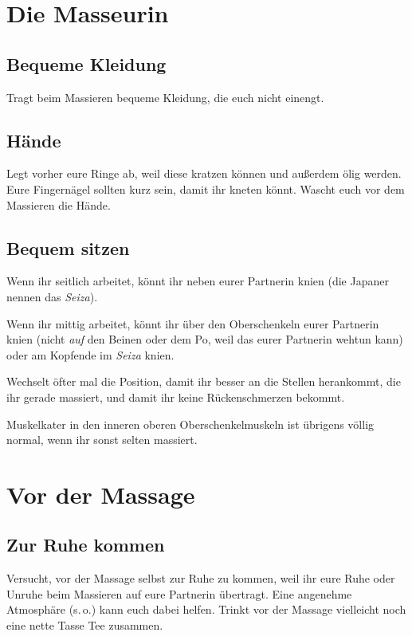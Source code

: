 \section{Die Masseurin}

\subsection{Bequeme Kleidung}

Tragt beim Massieren bequeme Kleidung, die euch nicht einengt.

\subsection{Hände}

Legt vorher eure Ringe ab, weil diese kratzen können und außerdem ölig werden. Eure Fingernägel sollten kurz sein, damit ihr kneten könnt. Wascht euch vor dem Massieren die Hände.

\subsection{Bequem sitzen}

Wenn ihr seitlich arbeitet, könnt ihr neben eurer Partnerin knien (die Japaner nennen das \emph{Seiza}).

Wenn ihr mittig arbeitet, könnt ihr über den Oberschenkeln eurer Partnerin knien (nicht \emph{auf} den Beinen oder dem Po, weil das eurer Partnerin wehtun kann) oder am Kopfende im \emph{Seiza} knien.

Wechselt öfter mal die Position, damit ihr besser an die Stellen herankommt, die ihr gerade massiert, und damit ihr keine Rückenschmerzen bekommt.

Muskelkater in den inneren oberen Oberschenkelmuskeln ist übrigens völlig normal, wenn ihr sonst selten massiert.


\section{Vor der Massage}

\subsection{Zur Ruhe kommen}

Versucht, vor der Massage selbst zur Ruhe zu kommen, weil ihr eure Ruhe oder Unruhe beim Massieren auf eure Partnerin übertragt. Eine angenehme Atmosphäre (s.\,o.) kann euch dabei helfen. Trinkt vor der Massage vielleicht noch eine nette Tasse Tee zusammen.


